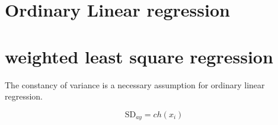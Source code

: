 \documentclass[Chap3amain.tex]{subfiles}
\begin{document}
\section{Ordinary Linear regression}

\newpage
\section{weighted least square regression}
The constancy of variance is a necessary assumption for ordinary
linear regression.

\begin{equation}
\mbox{SD}_{ay}  = ch(x_{i})
\end{equation}
\end{document}
